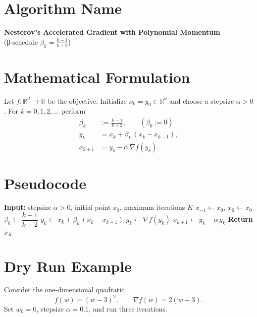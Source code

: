 \documentclass{article}
\newcommand{\grad}{\nabla}
\begin{document}
\section*{Algorithm Name}
\textbf{Nesterov’s Accelerated Gradient with Polynomial Momentum}\\
(β‑schedule $\displaystyle \beta_k=\frac{k-1}{k+2}$)

\section*{Mathematical Formulation}
Let $f:\mathbb{R}^d\rightarrow\mathbb{R}$ be the objective.
Initialize $x_{0}=y_{0}\in\mathbb{R}^d$ and choose a stepsize $\alpha>0$.
For $k=0,1,2,\dots$ perform
\[
\boxed{
\begin{aligned}
\beta_k &:= \frac{k-1}{k+2},\qquad (\beta_0:=0)\\[2mm]
y_k    &= x_k + \beta_k\,(x_k-x_{k-1}) ,\\[2mm]
x_{k+1}&= y_k - \alpha\,\grad f(y_k).
\end{aligned}}
\tag{1}
\]

\section*{Pseudocode}
\begin{algorithm}[H]
\caption{Nesterov Accelerated Gradient (NAG) with $\beta_k=\frac{k-1}{k+2}$}
\begin{algorithmic}[1]
\State \textbf{Input:} stepsize $\alpha>0$, initial point $x_0$, maximum iterations $K$
\State $x_{-1}\gets x_0$, $x_0\gets x_0$
    \State $\beta_k \gets \dfrac{k-1}{k+2}$ 
    \State $y_k \gets x_k + \beta_k\,(x_k - x_{k-1})$
    \State $g_k \gets \grad f(y_k)$
    \State $x_{k+1} \gets y_k - \alpha\, g_k$
\EndFor
\State \textbf{Return} $x_{K}$
\end{algorithmic}
\end{algorithm}

\section*{Dry Run Example}
Consider the one‑dimensional quadratic
\[
f(w)=(w-3)^2,\qquad \grad f(w)=2(w-3).
\]
Set $w_0=0$, stepsize $\alpha=0.1$, and run three iterations.
\end{document}
